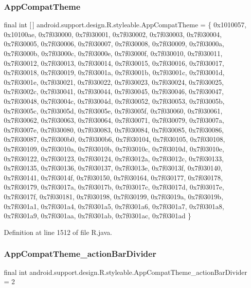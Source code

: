 \subsubsection{\texorpdfstring{AppCompatTheme}{AppCompatTheme}}
{\footnotesize\ttfamily final int \mbox{[}$\,$\mbox{]} android.\+support.\+design.\+R.\+styleable.\+App\+Compat\+Theme = \{ 0x1010057, 0x10100ae, 0x7f030000, 0x7f030001, 0x7f030002, 0x7f030003, 0x7f030004, 0x7f030005, 0x7f030006, 0x7f030007, 0x7f030008, 0x7f030009, 0x7f03000a, 0x7f03000b, 0x7f03000c, 0x7f03000e, 0x7f03000f, 0x7f030010, 0x7f030011, 0x7f030012, 0x7f030013, 0x7f030014, 0x7f030015, 0x7f030016, 0x7f030017, 0x7f030018, 0x7f030019, 0x7f03001a, 0x7f03001b, 0x7f03001c, 0x7f03001d, 0x7f03001e, 0x7f030021, 0x7f030022, 0x7f030023, 0x7f030024, 0x7f030025, 0x7f03002c, 0x7f030041, 0x7f030044, 0x7f030045, 0x7f030046, 0x7f030047, 0x7f030048, 0x7f03004c, 0x7f03004d, 0x7f030052, 0x7f030053, 0x7f03005b, 0x7f03005c, 0x7f03005d, 0x7f03005e, 0x7f03005f, 0x7f030060, 0x7f030061, 0x7f030062, 0x7f030063, 0x7f030064, 0x7f030071, 0x7f030079, 0x7f03007a, 0x7f03007e, 0x7f030080, 0x7f030083, 0x7f030084, 0x7f030085, 0x7f030086, 0x7f030087, 0x7f0300b0, 0x7f0300b6, 0x7f030104, 0x7f030105, 0x7f030108, 0x7f030109, 0x7f03010a, 0x7f03010b, 0x7f03010c, 0x7f03010d, 0x7f03010e, 0x7f030122, 0x7f030123, 0x7f030124, 0x7f03012a, 0x7f03012c, 0x7f030133, 0x7f030135, 0x7f030136, 0x7f030137, 0x7f03013e, 0x7f03013f, 0x7f030140, 0x7f030141, 0x7f03014f, 0x7f030150, 0x7f030164, 0x7f030177, 0x7f030178, 0x7f030179, 0x7f03017a, 0x7f03017b, 0x7f03017c, 0x7f03017d, 0x7f03017e, 0x7f03017f, 0x7f030181, 0x7f030198, 0x7f030199, 0x7f03019a, 0x7f03019b, 0x7f0301a1, 0x7f0301a4, 0x7f0301a5, 0x7f0301a6, 0x7f0301a7, 0x7f0301a8, 0x7f0301a9, 0x7f0301aa, 0x7f0301ab, 0x7f0301ac, 0x7f0301ad \}\hspace{0.3cm}{\ttfamily [static]}}



Definition at line 1512 of file R.\+java.

\mbox{\label{classandroid_1_1support_1_1design_1_1_r_1_1styleable_af6a9eaeff0ad44a2869e2b2e9b333e1e}} 
\subsubsection{\texorpdfstring{AppCompatTheme\_actionBarDivider}{AppCompatTheme\_actionBarDivider}}
{\footnotesize\ttfamily final int android.\+support.\+design.\+R.\+styleable.\+App\+Compat\+Theme\+\_\+action\+Bar\+Divider = 2\hspace{0.3cm}{\ttfamily [static]}}



